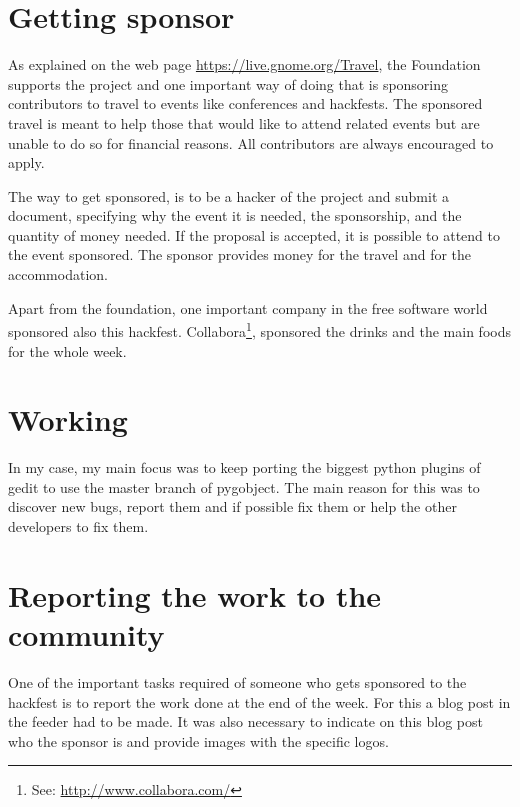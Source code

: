 \section{Getting sponsor}

As explained on the web page \url{https://live.gnome.org/Travel}, the \GNOME Foundation supports the \GNOME project and one important way of doing that is sponsoring contributors to travel to \GNOME events like conferences and hackfests. The sponsored travel is meant to help those that would like to attend \GNOME related events but are unable to do so for financial reasons. All \GNOME contributors are always encouraged to apply.

The way to get sponsored, is to be a hacker of the \GNOME project and submit a document, specifying why the event it is needed,  the sponsorship, and the quantity of money needed. If the proposal is accepted, it is possible to attend to the event sponsored. The sponsor provides money for the travel and for the accommodation.

Apart from the \GNOME foundation, one important company in the free software world sponsored also this hackfest. Collabora\footnote{See: \url{http://www.collabora.com/}},  sponsored the drinks and the main foods for the whole week.

\section{Working}

In my case, my main focus was to keep porting the biggest python plugins of gedit to use the master branch of pygobject. 
The main reason for this was to discover new bugs, report them and if possible fix them or help the other developers to fix them.

\newpage
\section{Reporting the work to the community}

One of the important tasks required of someone who gets sponsored to the hackfest is to report the work done at the end of the week. For this a blog post in the \GNOME feeder had to be made. It was also necessary to indicate on this blog post who the sponsor is and provide images with the specific logos.

